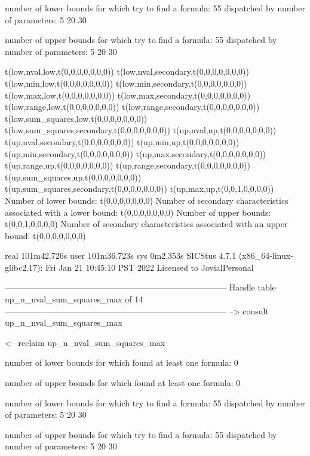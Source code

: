 number of lower bounds for which try to find a formula: 55
dispatched by number of parameters: 5  20  30

number of upper bounds for which try to find a formula: 55
dispatched by number of parameters: 5  20  30

t(low,nval,low,t(0,0,0,0,0,0,0))
t(low,nval,secondary,t(0,0,0,0,0,0,0))
t(low,min,low,t(0,0,0,0,0,0,0))
t(low,min,secondary,t(0,0,0,0,0,0,0))
t(low,max,low,t(0,0,0,0,0,0,0))
t(low,max,secondary,t(0,0,0,0,0,0,0))
t(low,range,low,t(0,0,0,0,0,0,0))
t(low,range,secondary,t(0,0,0,0,0,0,0))
t(low,sum_squares,low,t(0,0,0,0,0,0,0))
t(low,sum_squares,secondary,t(0,0,0,0,0,0,0))
t(up,nval,up,t(0,0,0,0,0,0,0))
t(up,nval,secondary,t(0,0,0,0,0,0,0))
t(up,min,up,t(0,0,0,0,0,0,0))
t(up,min,secondary,t(0,0,0,0,0,0,0))
t(up,max,secondary,t(0,0,0,0,0,0,0))
t(up,range,up,t(0,0,0,0,0,0,0))
t(up,range,secondary,t(0,0,0,0,0,0,0))
t(up,sum_squares,up,t(0,0,0,0,0,0,0))
t(up,sum_squares,secondary,t(0,0,0,0,0,0,0))
t(up,max,up,t(0,0,1,0,0,0,0))
Number of lower bounds:                                             t(0,0,0,0,0,0,0)
Number of secondary characteristics associated with a lower bound:  t(0,0,0,0,0,0,0)
Number of upper bounds:                                             t(0,0,1,0,0,0,0)
Number of secondary characteristics associated with an upper bound: t(0,0,0,0,0,0,0)

real	101m42.726s
user	101m36.723s
sys	0m2.353s
SICStus 4.7.1 (x86_64-linux-glibc2.17): Fri Jan 21 10:45:10 PST 2022
Licensed to JovialPersonal


--------------------------------------------------------------------------------
Handle table up_n_nval_sum_squares_max of 14
--------------------------------------------------------------------------------
--> consult up_n_nval_sum_squares_max

<-- reclaim up_n_nval_sum_squares_max

number of lower bounds for which found at least one formula: 0

number of upper bounds for which found at least one formula: 0

number of lower bounds for which try to find a formula: 55
dispatched by number of parameters: 5  20  30

number of upper bounds for which try to find a formula: 55
dispatched by number of parameters: 5  20  30

